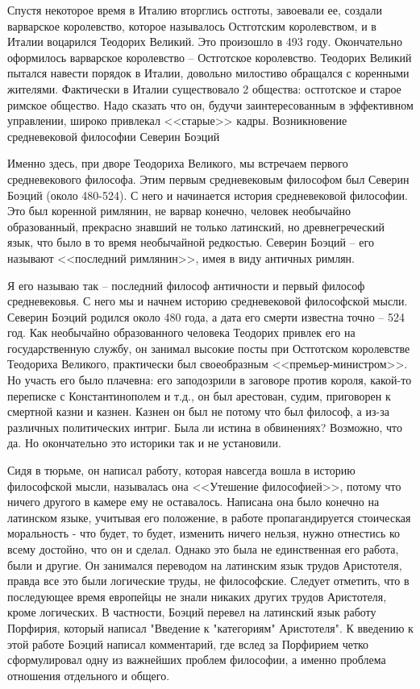 Спустя некоторое время в Италию вторглись остготы, завоевали ее, создали варварское королевство, которое называлось Остготским королевством, и в Италии воцарился Теодорих Великий. Это произошло в 493 году. Окончательно оформилось варварское королевство – Остготское королевство. Теодорих Великий пытался навести порядок в Италии, довольно милостиво обращался с коренными жителями. Фактически в Италии существовало 2 общества: остготское и старое римское общество. Надо сказать что он, будучи заинтересованным в эффективном управлении, широко привлекал <<старые>> кадры.
Возникновение средневековой философии
Северин Боэций

Именно здесь, при дворе Теодориха Великого, мы встречаем первого средневекового философа. Этим первым средневековым философом был Северин Боэций (около 480-524). С него и начинается история средневековой философии. Это был коренной римлянин, не варвар конечно, человек необычайно образованный, прекрасно знавший не только латинский, но древнегреческий язык, что было в то время необычайной редкостью. Северин Боэций – его называют <<последний римлянин>>, имея в виду античных римлян.

Я его называю так – последний философ античности и первый философ средневековья. С него мы и начнем историю средневековой философской мысли. Северин Боэций родился около 480 года, а дата его смерти известна точно – 524 год. Как необычайно образованного человека Теодорих привлек его на государственную службу, он занимал высокие посты при Остготском королевстве Теодориха Великого, практически был своеобразным <<премьер-министром>>. Но участь его было плачевна: его заподозрили в заговоре против короля, какой-то переписке с Константинополем и т.д., он был арестован, судим, приговорен к смертной казни и казнен. Казнен он был не потому что был философ, а из-за различных политических интриг. Была ли истина в обвинениях? Возможно, что да. Но окончательно это историки так и не установили.

Сидя в тюрьме, он написал работу, которая навсегда вошла в историю философской мысли, называлась она <<Утешение философией>>, потому что ничего другого в камере ему не оставалось. Написана она было конечно на латинском языке, учитывая его положение, в работе пропагандируется стоическая моральность - что будет, то будет, изменить ничего нельзя, нужно отнестись ко всему достойно, что он и сделал. Однако это была не единственная его работа, были и другие. Он занимался переводом на латинским язык трудов Аристотеля, правда все это были логические труды, не философские. Следует отметить, что в последующее время европейцы не знали никаких других трудов Аристотеля, кроме логических. В частности, Боэций перевел на латинский язык работу Порфирия, который написал "Введение к "категориям" Аристотеля". К введению к этой работе Боэций написал комментарий, где вслед за Порфирием четко сформулировал одну из важнейших проблем философии, а именно проблема отношения отдельного и общего.

